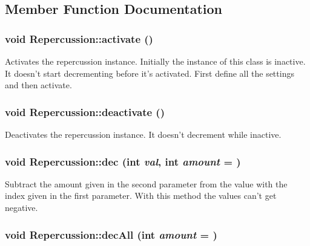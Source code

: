 \subsection{Member Function Documentation}
\hypertarget{classRepercussion_a19b9c3950397311c5f275fce451df5f6}{
\subsubsection[{activate}]{\setlength{\rightskip}{0pt plus 5cm}void Repercussion::activate ()}}
\label{classRepercussion_a19b9c3950397311c5f275fce451df5f6}
Activates the repercussion instance. Initially the instance of this class is inactive. It doesn't start decrementing before it's activated. First define all the settings and then activate. \hypertarget{classRepercussion_a0d1bcb6ab372efecb912006e038f2bd5}{
\subsubsection[{deactivate}]{\setlength{\rightskip}{0pt plus 5cm}void Repercussion::deactivate ()}}
\label{classRepercussion_a0d1bcb6ab372efecb912006e038f2bd5}
Deactivates the repercussion instance. It doesn't decrement while inactive. \hypertarget{classRepercussion_ac86fbba0711b097da755b6a7280eef63}{
\subsubsection[{dec}]{\setlength{\rightskip}{0pt plus 5cm}void Repercussion::dec (int {\em val}, \/  int {\em amount} = {})}}
\label{classRepercussion_ac86fbba0711b097da755b6a7280eef63}
Subtract the amount given in the second parameter from the value with the index given in the first parameter. With this method the values can't get negative. \hypertarget{classRepercussion_a87bb91156e63992084f6011b32acab8c}{
\subsubsection[{decAll}]{\setlength{\rightskip}{0pt plus 5cm}void Repercussion::decAll (int {\em amount} = {})}}
\label{classRepercussion_a87bb91156e63992084f6011b32acab8c}
